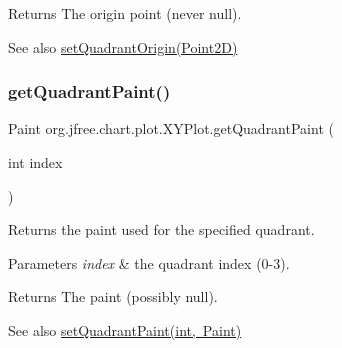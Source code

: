 \begin{DoxyReturn}{Returns}
The origin point (never {\ttfamily null}).
\end{DoxyReturn}
\begin{DoxySeeAlso}{See also}
\mbox{\hyperlink{classorg_1_1jfree_1_1chart_1_1plot_1_1_x_y_plot_a6b22586993f163c5212ed21517b32851}{set\+Quadrant\+Origin(\+Point2\+D)}} 
\end{DoxySeeAlso}
\mbox{\label{classorg_1_1jfree_1_1chart_1_1plot_1_1_x_y_plot_a20b4caa204dbf0f23b6d1400185baa97}} 
\subsubsection{\texorpdfstring{get\+Quadrant\+Paint()}{getQuadrantPaint()}}
{\footnotesize\ttfamily Paint org.\+jfree.\+chart.\+plot.\+X\+Y\+Plot.\+get\+Quadrant\+Paint (\begin{DoxyParamCaption}\item[{int}]{index }\end{DoxyParamCaption})}

Returns the paint used for the specified quadrant.


\begin{DoxyParams}{Parameters}
{\em index} & the quadrant index (0-\/3).\\
\hline
\end{DoxyParams}
\begin{DoxyReturn}{Returns}
The paint (possibly {\ttfamily null}).
\end{DoxyReturn}
\begin{DoxySeeAlso}{See also}
\mbox{\hyperlink{classorg_1_1jfree_1_1chart_1_1plot_1_1_x_y_plot_a52c03f4be6805639d5597eb247fcd249}{set\+Quadrant\+Paint(int, Paint)}} 
\end{DoxySeeAlso}
\mbox{\label{classorg_1_1jfree_1_1chart_1_1plot_1_1_x_y_plot_ae0fb9228ae5f8d5019fe6bdbe5f2807e}} 
